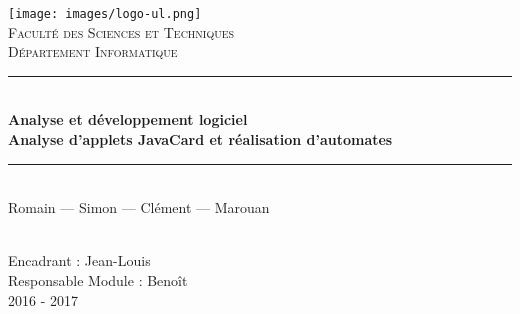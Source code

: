 \begin{titlepage}
\begin{center}

    \texttt{[image: images/logo-ul.png]} ~\\[1cm]
    \textsc{\LARGE Faculté des Sciences et Techniques} \\[0.5cm]
    \textsc{\Large Département Informatique} \\[1.5cm]

    \vspace*{3,5cm}

    \hrule height 0.05cm ~\\[0.4cm]
    {\huge \bfseries Analyse et développement logiciel} \\[0.5cm]
    {\LARGE \bfseries Analyse d'applets JavaCard et réalisation d'automates} \\[0.5cm]
    \hrule height 0.05cm ~\\[0.6cm]

    {\large Romain  ---
	Simon  ---
	Clément  ---
	Marouan  }

    ~\\[2cm]


    \vfill
    Encadrant : 	 Jean-Louis \\
	Responsable Module :  Benoît\\
    {\large  2016 - 2017 \\}

\end{center}
\end{titlepage}